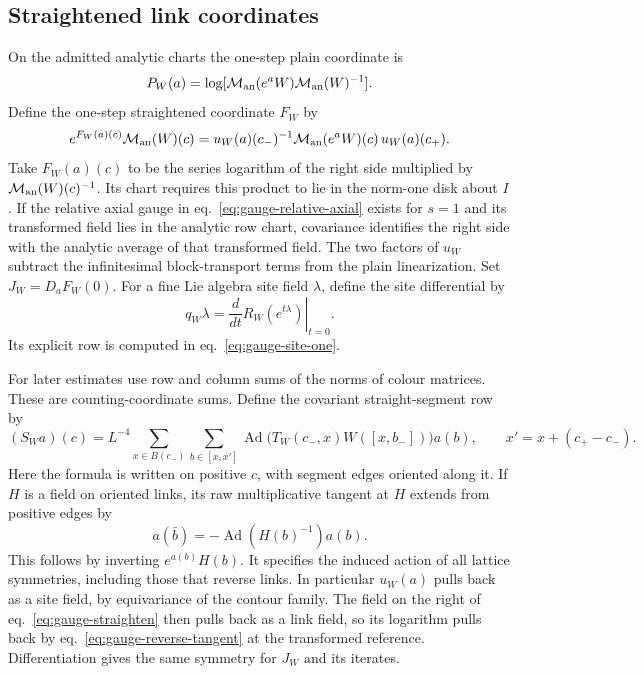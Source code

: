 \documentclass[11pt,letterpaper,reqno]{amsart}
\numberwithin{equation}{section}
\renewcommand{\eqref}[1]{\textup{eq.~\ref{#1}}}
\theoremstyle{definition}
\theoremstyle{remark}
\begin{document}
\subsection{Straightened link coordinates}

On the admitted analytic charts the one-step plain coordinate is
\[
 P_W(a)=\log[\mathcal M_{\rm an}(e^aW)\mathcal M_{\rm an}(W)^{-1}].
\]
Define the one-step straightened
coordinate \(F_W\) by
\begin{equation}\label{eq:gauge-straighten}
 e^{F_W(a)(c)}\mathcal M_{\rm an}(W)(c)
 =u_W(a)(c_-)^{-1}\mathcal M_{\rm an}(e^aW)(c)\,u_W(a)(c_+) .
\end{equation}
Take \(F_W(a)(c)\) to be the series logarithm of the right side
multiplied by \(\mathcal M_{\rm an}(W)(c)^{-1}\). Its chart requires
this product to lie in the norm-one disk about \(I\).
If the relative axial gauge in \eqref{eq:gauge-relative-axial}
exists for \(s=1\) and its transformed field lies in the analytic
row chart, covariance identifies the right side with the analytic
average of that transformed field. The two
factors of \(u_W\) subtract the infinitesimal block-transport terms
from the plain linearization. Set \(J_W=D_aF_W(0)\). For a fine
Lie algebra site field \(\lambda\), define the site differential by
\[
 q_W\lambda=\left.\frac{d}{dt}R_W(e^{t\lambda})\right|_{t=0}.
\]
Its explicit row is computed in \eqref{eq:gauge-site-one}.

For later estimates use row and column sums of the norms of colour
matrices. These are counting-coordinate sums. Define the covariant
straight-segment row by
\begin{equation}\label{eq:gauge-straight-row}
 (S_Wa)(c)= L^{-4}\sum_{x\in B(c_-)}
 \sum_{b\in[x,x']}
 \operatorname{Ad}\!\big(T_W(c_-,x)W([x,b_-])\big)a(b),
 \qquad x'=x+(c_+-c_-).
\end{equation}
Here the formula is written on positive \(c\), with segment edges
oriented along it. If \(H\) is a field on oriented links, its raw
multiplicative tangent at \(H\) extends from positive edges by
\begin{equation}\label{eq:gauge-reverse-tangent}
 a(\bar b)=-\operatorname{Ad}(H(b)^{-1})a(b).
\end{equation}
This follows by inverting \(e^{a(b)}H(b)\). It specifies the induced
action of all lattice symmetries, including those that reverse links.
In particular \(u_W(a)\) pulls back as a site field, by equivariance
of the contour family. The field on the right of
\eqref{eq:gauge-straighten} then pulls back as a link field, so its
logarithm pulls back by \eqref{eq:gauge-reverse-tangent} at the
transformed reference. Differentiation gives the same symmetry
for \(J_W\) and its iterates.
\end{document}
